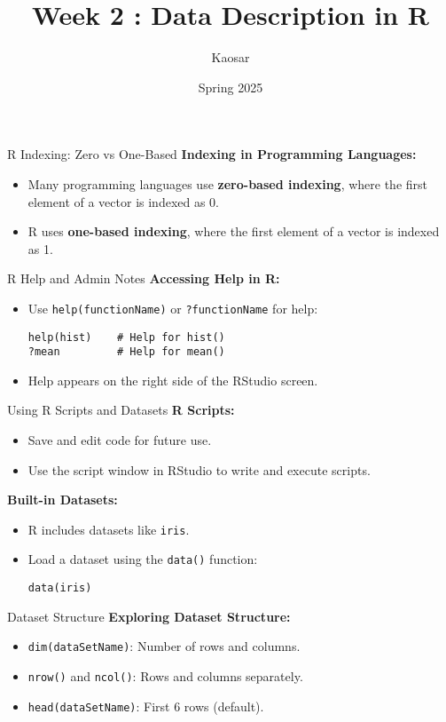 \documentclass{beamer}
\title{Week 2 : Data Description in R}
\author{Kaosar}
\institute{Auburn University}
\date{Spring 2025}
\begin{document}
\frame{\titlepage}

\begin{frame}{R Indexing: Zero vs One-Based}
\textbf{Indexing in Programming Languages:}
\begin{itemize}
    \item Many programming languages use \textbf{zero-based indexing}, where the first element of a vector is indexed as 0.
    \item R uses \textbf{one-based indexing}, where the first element of a vector is indexed as 1.
\end{itemize}
\end{frame}

\begin{frame}[fragile]{R Help and Admin Notes}
\textbf{Accessing Help in R:}
\begin{itemize}
    \item Use \texttt{help(functionName)} or \texttt{?functionName} for help:
    \begin{verbatim}
help(hist)    # Help for hist()
?mean         # Help for mean()
    \end{verbatim}
    \item Help appears on the right side of the RStudio screen.
\end{itemize}
\end{frame}

\begin{frame}[fragile]{Using R Scripts and Datasets}
\textbf{R Scripts:}
\begin{itemize}
    \item Save and edit code for future use.
    \item Use the script window in RStudio to write and execute scripts.
\end{itemize}

\textbf{Built-in Datasets:}
\begin{itemize}
    \item R includes datasets like \texttt{iris}.
    \item Load a dataset using the \texttt{data()} function:
\begin{verbatim}
data(iris)
\end{verbatim}
\end{itemize}
\end{frame}

\begin{frame}[fragile]{Dataset Structure}
\textbf{Exploring Dataset Structure:}
\begin{itemize}
    \item \texttt{dim(dataSetName)}: Number of rows and columns.
    \item \texttt{nrow()} and \texttt{ncol()}: Rows and columns separately.
    \item \texttt{head(dataSetName)}: First 6 rows (default).
\end{itemize}
\end{frame}
\end{document}

